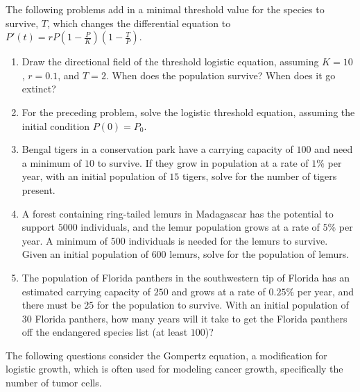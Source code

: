 \documentclass{exercises}
\begin{document}
The following problems add in a minimal threshold value for the species to survive, $T$, which changes the differential equation to $P'(t)=rP(1-\frac{P}{K})(1-\frac{T}{P})$.

\begin{enumerate}[resume]
\item Draw the directional field of the threshold logistic equation, assuming $K=10$, $r=0.1$, and $T=2$. When does the population survive? When does it go extinct?
\item For the preceding problem, solve the logistic threshold equation, assuming the initial condition $P(0)=P_{0}$.
\item Bengal tigers in a conservation park have a carrying capacity of $100$ and need a minimum of $10$ to survive. If they grow in population at a rate of $1\%$ per year, with an initial population of $15$ tigers, solve for the number of tigers present.
\item A forest containing ring-tailed lemurs in Madagascar has the potential to support $5000$ individuals, and the lemur population grows at a rate of $5\%$ per year. A minimum of $500$ individuals is needed for the lemurs to survive. Given an initial population of $600$ lemurs, solve for the population of lemurs.
\item The population of Florida panthers in the southwestern tip of Florida has an estimated carrying capacity of $250$ and grows at a rate of $0.25\%$ per year, and there must be $25$ for the population to survive. With an initial population of $30$ Florida panthers, how many years will it take to get the Florida panthers off the endangered species list (at least $100$)?
\end{enumerate}

The following questions consider the Gompertz equation, a modification for logistic growth, which is often used for modeling cancer growth, specifically the number of tumor cells.
\end{document}
